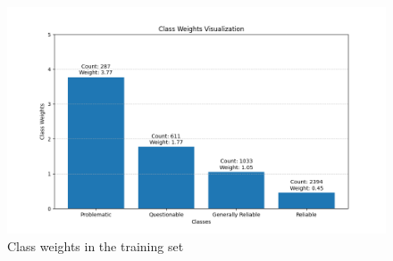 \begin{figure}[htbp]
    \centering
    \includegraphics[width=0.9\linewidth]{figures/class_weights.png}
    \caption{Class weights in the training set}
    \label{fig:class_weights}
\end{figure}



